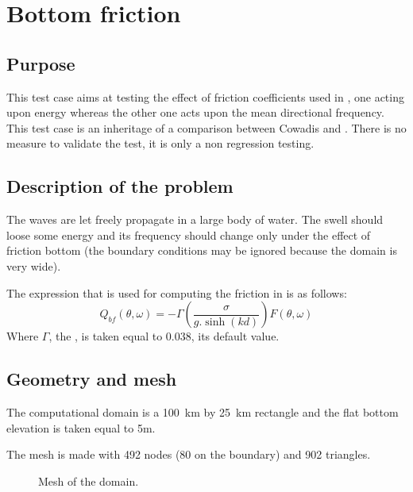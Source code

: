 \chapter{Bottom friction}
%

%
\section{Purpose}
%
This test case aims at testing the effect of friction coefficients used in
\tomawac, one acting upon energy whereas the other one acts upon the mean
directional frequency. This test case is an inheritage of a comparison between
Cowadis and \tomawac. There is no measure to validate the test, it is only a non
regression testing.



%
\section{Description of the problem}
The waves are let freely propagate in a large body of water. The swell should
loose some energy and its frequency should change only under the effect of
friction bottom (the boundary conditions may be ignored because the domain is
very wide).

The expression that is used for computing the friction in \tomawac is as
follows:
\begin{equation}
Q_{bf}(\theta,\omega)=-\Gamma \left(\frac{\sigma}{g.\sinh(kd)}\right)F(\theta,\omega)
\end{equation}
Where $\Gamma$, the , is taken equal to
0.038, its default value.

\section{Geometry and mesh}
The computational domain is a 100~km by 25~km rectangle and the flat bottom
elevation is taken equal to 5m.

The mesh is made with 492 nodes (80 on the boundary) and 902 triangles.

\begin{figure} [!h]
\centering
{}
\caption{Mesh of the domain.}
\label{mailbf}
\end{figure}

